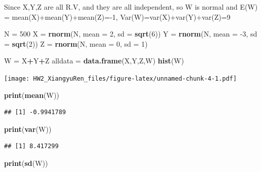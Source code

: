 \documentclass[
]{article}
\newenvironment{Shaded}{\begin{snugshade}}{\end{snugshade}}
\newcommand{\DataTypeTok}[1]{\textcolor[rgb]{0.13,0.29,0.53}{#1}}
\newcommand{\DecValTok}[1]{\textcolor[rgb]{0.00,0.00,0.81}{#1}}
\newcommand{\KeywordTok}[1]{\textcolor[rgb]{0.13,0.29,0.53}{\textbf{#1}}}
\newcommand{\NormalTok}[1]{#1}
\newcommand{\OperatorTok}[1]{\textcolor[rgb]{0.81,0.36,0.00}{\textbf{#1}}}
\newcommand{\StringTok}[1]{\textcolor[rgb]{0.31,0.60,0.02}{#1}}
\begin{document}
Since X,Y,Z are all R.V, and they are all independent, so W is normal
and E(W) = mean(X)+mean(Y)+mean(Z)=-1, Var(W)=var(X)+var(Y)+var(Z)=9

\begin{Shaded}
\begin{Highlighting}[]
\NormalTok{N =}\StringTok{ }\DecValTok{500}
\NormalTok{X =}\StringTok{ }\KeywordTok{rnorm}\NormalTok{(N, }\DataTypeTok{mean =} \DecValTok{2}\NormalTok{, }\DataTypeTok{sd =} \KeywordTok{sqrt}\NormalTok{(}\DecValTok{6}\NormalTok{))}
\NormalTok{Y =}\StringTok{ }\KeywordTok{rnorm}\NormalTok{(N, }\DataTypeTok{mean =} \DecValTok{-3}\NormalTok{, }\DataTypeTok{sd =} \KeywordTok{sqrt}\NormalTok{(}\DecValTok{2}\NormalTok{))}
\NormalTok{Z =}\StringTok{ }\KeywordTok{rnorm}\NormalTok{(N, }\DataTypeTok{mean =} \DecValTok{0}\NormalTok{, }\DataTypeTok{sd =} \DecValTok{1}\NormalTok{)}

\NormalTok{W =}\StringTok{ }\NormalTok{X}\OperatorTok{+}\NormalTok{Y}\OperatorTok{+}\NormalTok{Z}
\NormalTok{alldata =}\StringTok{ }\KeywordTok{data.frame}\NormalTok{(X,Y,Z,W)}
\KeywordTok{hist}\NormalTok{(W)}
\end{Highlighting}
\end{Shaded}

\texttt{[image: HW2\_XiangyuRen\_files/figure-latex/unnamed-chunk-4-1.pdf]}

\begin{Shaded}
\begin{Highlighting}[]
\KeywordTok{print}\NormalTok{(}\KeywordTok{mean}\NormalTok{(W))}
\end{Highlighting}
\end{Shaded}

\begin{verbatim}
## [1] -0.9941789
\end{verbatim}

\begin{Shaded}
\begin{Highlighting}[]
\KeywordTok{print}\NormalTok{(}\KeywordTok{var}\NormalTok{(W))}
\end{Highlighting}
\end{Shaded}

\begin{verbatim}
## [1] 8.417299
\end{verbatim}

\begin{Shaded}
\begin{Highlighting}[]
\KeywordTok{print}\NormalTok{(}\KeywordTok{sd}\NormalTok{(W))}
\end{Highlighting}
\end{Shaded}
\end{document}
